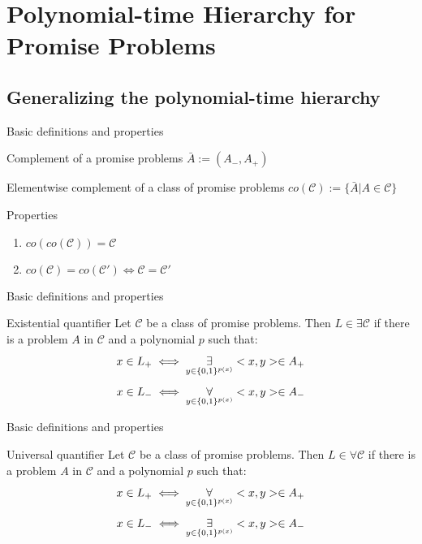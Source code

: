 \section{Polynomial-time Hierarchy for Promise Problems}
    \subsection{Generalizing the polynomial-time hierarchy}
    
        \begin{frame}{Basic definitions and properties}
            \begin{block}{Complement of a promise problems}
                $\bar{A} := (A_-,A_+)$
            \end{block}
            \pause
            \begin{block}{Elementwise complement of a class of promise problems}
                $co(\mathcal{C}) := \{\bar{A}| A\in \mathcal{C}\}$
            \end{block}
            \pause
            \begin{block}{Properties}
                \begin{enumerate}
                    \item $co(co(\mathcal{C})) = \mathcal{C}$
                    \item $co(\mathcal{C}) = co(\mathcal{C}') \iff \mathcal{C} = \mathcal{C}'$
                \end{enumerate}
            \end{block}
        \end{frame}
        \begin{frame}{Basic definitions and properties}
            \begin{block}{Existential quantifier}
                Let $\mathcal{C}$ be a class of promise problems. Then $L \in \exists \mathcal{C}$ if there is a problem $A$ in $\mathcal{C}$ and a polynomial $p$ such that:
                $$x\in L_+ \iff \overset{{}}{\underset{{y \in \{0,1\}^{p(x)}}}{\Large \exists}} <x,y> \in A_+$$
                $$x\in L_- \iff \overset{{}}{\underset{{y \in \{0,1\}^{p(x)}}}{\Large \forall}} <x,y> \in A_-$$
            \end{block}
        \end{frame}
        \begin{frame}{Basic definitions and properties}
            \begin{block}{Universal quantifier}
                Let $\mathcal{C}$ be a class of promise problems. Then $L \in \forall \mathcal{C}$ if there is a problem $A$ in $\mathcal{C}$ and a polynomial $p$ such that:
                $$x\in L_+ \iff \overset{{}}{\underset{{y \in \{0,1\}^{p(x)}}}{\Large \forall}} <x,y> \in A_+$$
                $$x\in L_- \iff \overset{{}}{\underset{{y \in \{0,1\}^{p(x)}}}{\Large \exists}} <x,y> \in A_-$$
            \end{block}
        \end{frame}
